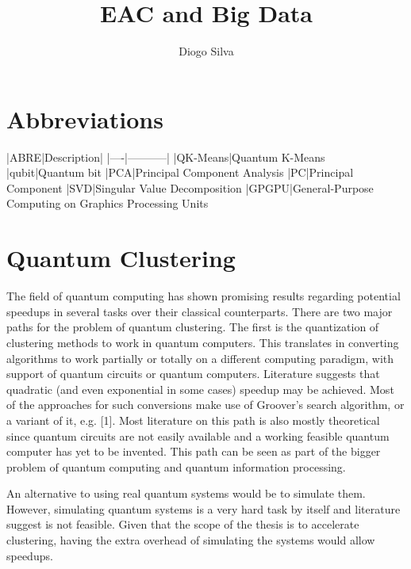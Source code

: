 \documentclass[10pt,a4paper,final]{article}
\author{Diogo Silva}
\title{EAC and Big Data}
\begin{document}
\onehalfspacing %

\tableofcontents









\section{Abbreviations}

|ABRE|Description|
|----|-----------|
|QK-Means|Quantum K-Means
|qubit|Quantum bit
|PCA|Principal Component Analysis
|PC|Principal Component
|SVD|Singular Value Decomposition
|GPGPU|General-Purpose Computing on Graphics Processing Units




\section{Quantum Clustering}

The field of quantum computing has shown promising results regarding potential speedups in several tasks over their classical counterparts. 
There are two major paths for the problem of quantum clustering. The first is the quantization of clustering methods to work in quantum computers. This translates in converting algorithms to work partially or totally on a different computing paradigm, with support of quantum circuits or quantum computers. Literature suggests that quadratic (and even exponential in some cases) speedup may be achieved. Most of the approaches for such conversions make use of Groover's search algorithm, or a variant of it, e.g. [1]. Most literature on this path is also mostly theoretical since quantum circuits are not easily available and a working feasible quantum computer has yet to be invented. This path can be seen as part of the bigger problem of quantum computing and quantum information processing.


An alternative to using real quantum systems would be to simulate them. However, simulating quantum systems is a very hard task by itself and literature suggest is not feasible. Given that the scope of the thesis is to accelerate clustering, having the extra overhead of simulating the systems would allow speedups.
\end{document}
